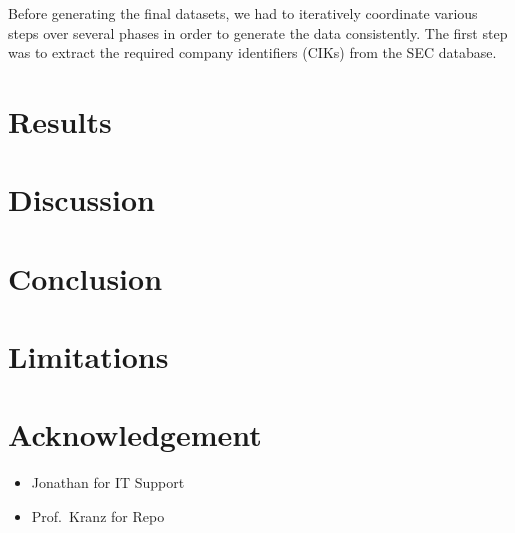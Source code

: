 \documentclass[manuscript,screen,review]{acmart}
\providecommand{\tightlist}{%
  \setlength{\itemsep}{0pt}\setlength{\parskip}{0pt}}\usepackage{longtable,booktabs,array}
\begin{document}
Before generating the final datasets, we had to iteratively coordinate
various steps over several phases in order to generate the data
consistently. The first step was to extract the required company
identifiers (CIKs) from the SEC database.

\section{Results}\label{results}

\section{Discussion}\label{discussion}

\section{Conclusion}\label{conclusion}

\section{Limitations}\label{limitations}

\section{Acknowledgement}\label{acknowledgement}

\begin{itemize}
\tightlist
\item
  Jonathan for IT Support
\item
  Prof.~Kranz for Repo
\end{itemize}

\end{document}
